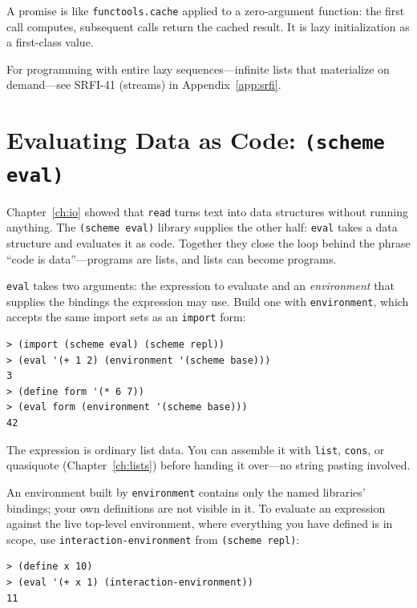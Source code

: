 \begin{note}
A promise is like \texttt{functools.cache} applied to a zero-argument function: the first call computes, subsequent calls return the cached result. It is lazy initialization as a first-class value.
\end{note}

For programming with entire lazy sequences---infinite lists that materialize on demand---see SRFI-41 (streams) in Appendix~\ref{app:srfi}.

\section{Evaluating Data as Code: \texttt{(scheme eval)}}

Chapter~\ref{ch:io} showed that \texttt{read} turns text into data structures without running anything. The \texttt{(scheme eval)} library supplies the other half: \texttt{eval} takes a data structure and evaluates it as code. Together they close the loop behind the phrase ``code is data''---programs are lists, and lists can become programs.

\texttt{eval} takes two arguments: the expression to evaluate and an \emph{environment} that supplies the bindings the expression may use. Build one with \texttt{environment}, which accepts the same import sets as an \texttt{import} form:

\begin{lstlisting}[style=repl]
> (import (scheme eval) (scheme repl))
> (eval '(+ 1 2) (environment '(scheme base)))
3
> (define form '(* 6 7))
> (eval form (environment '(scheme base)))
42
\end{lstlisting}

The expression is ordinary list data. You can assemble it with \texttt{list}, \texttt{cons}, or quasiquote (Chapter~\ref{ch:lists}) before handing it over---no string pasting involved.

An environment built by \texttt{environment} contains only the named libraries' bindings; your own definitions are not visible in it. To evaluate an expression against the live top-level environment, where everything you have defined is in scope, use \texttt{interaction-environment} from \texttt{(scheme repl)}:

\begin{lstlisting}[style=repl]
> (define x 10)
> (eval '(+ x 1) (interaction-environment))
11
\end{lstlisting}

